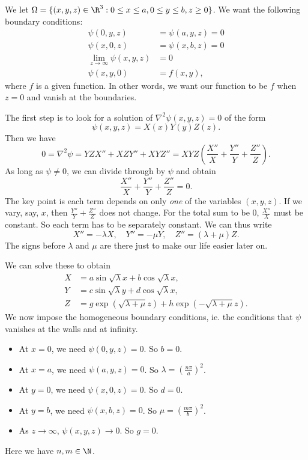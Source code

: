 \documentclass[a4paper]{article}
\begin{document}
We let $\Omega = \{(x, y, z) \in \R^3: 0 \leq x \leq a, 0 \leq y \leq b, z \geq 0\}$. We want the following boundary conditions:
\begin{align*}
  \psi(0, y, z) &= \psi(a, y, z) = 0\\
  \psi(x, 0, z) &= \psi(x, b, z) = 0\\
  \lim_{z\to \infty} \psi(x, y, z) &= 0\\
  \psi(x, y, 0) &= f(x, y),
\end{align*}
where $f$ is a given function. In other words, we want our function to be $f$ when $z = 0$ and vanish at the boundaries.

The first step is to look for a solution of $\nabla^2 \psi(x, y, z) = 0$ of the form
\[
  \psi(x, y, z) = X(x)Y(y)Z(z).
\]
Then we have
\[
  0 = \nabla^2 \psi = YZX'' + XZY'' + XYZ'' = XYZ \left(\frac{X''}{X} + \frac{Y''}{Y} + \frac{Z''}{Z}\right).
\]
As long as $\psi \not= 0$, we can divide through by $\psi$ and obtain
\[
  \frac{X''}{X} + \frac{Y''}{Y} + \frac{Z''}{Z} = 0.
\]
The key point is each term depends on only \emph{one} of the variables $(x, y, z)$. If we vary, say, $x$, then $\frac{Y''}{Y} + \frac{Z''}{Z}$ does not change. For the total sum to be $0$, $\frac{X''}{X}$ must be constant. So each term has to be separately constant. We can thus write
\[
  X'' = -\lambda X,\quad Y'' = -\mu Y,\quad Z'' = (\lambda + \mu) Z.
\]
The signs before $\lambda$ and $\mu$ are there just to make our life easier later on.

We can solve these to obtain
\begin{align*}
  X &= a\sin \sqrt{\lambda} x + b \cos \sqrt{\lambda} x,\\
  Y &= c\sin \sqrt{\lambda} y + d \cos \sqrt{\lambda} x,\\
  Z &= g\exp(\sqrt{\lambda + \mu} z) + h\exp(-\sqrt{\lambda + \mu} z).
\end{align*}
We now impose the homogeneous boundary conditions, ie. the conditions that $\psi$ vanishes at the walls and at infinity.
\begin{itemize}
  \item At $x = 0$, we need $\psi(0, y, z) = 0$. So $b = 0$.
  \item At $x = a$, we need $\psi(a, y, z) = 0$. So $\lambda = \left(\frac{n\pi}{a}\right)^2$.
  \item At $y = 0$, we need $\psi(x, 0, z) = 0$. So $d = 0$.
  \item At $y = b$, we need $\psi(x, b, z) = 0$. So $\mu = \left(\frac{m\pi}{b}\right)^2$.
  \item As $z \to \infty$, $\psi(x, y, z) \to 0$. So $g = 0$.
\end{itemize}
Here we have $n, m \in \N$.
\end{document}
